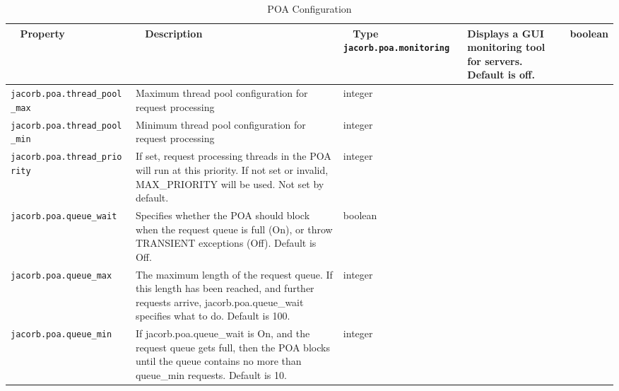 {{\begin{small}
\begin{longtable}{|p{5cm}|p{9cm}|p{2cm}|}
\hline
\end{longtable}
\end{small}


\begin{small}
\begin{longtable}{|p{5cm}|p{9cm}|p{2cm}|}
\caption{POA Configuration}\\
\hline
~ \hfill \textbf {Property} \hfill ~ & ~ \hfill \textbf {Description} \hfill ~ & ~ \hfill \textbf {Type} \hfill ~ \endhead
\hline
\verb"jacorb.poa.monitoring" & Displays a GUI monitoring tool for servers. Default is off. & boolean \\
\hline
\verb"jacorb.poa.thread_pool"
\verb"_max" & Maximum thread pool configuration for request processing & integer \\
\hline
\verb"jacorb.poa.thread_pool"
\verb"_min" & Minimum thread pool configuration for request processing & integer \\
\hline
\verb"jacorb.poa.thread_prio"
\verb"rity" & If set, request processing threads in the POA will run at this priority. If not set or invalid, MAX\_PRIORITY will be used. Not set by default. & integer \\
\hline
\verb"jacorb.poa.queue_wait" & Specifies whether the POA should block
when the request queue is full (On), or throw TRANSIENT exceptions
(Off). Default is Off. & boolean\\
\hline
\verb"jacorb.poa.queue_max" & The maximum length of the request
queue.  If this length has been reached, and further requests arrive,
jacorb.poa.queue\_wait specifies what to do. Default is 100. & integer \\
\hline
\verb"jacorb.poa.queue_min" & If jacorb.poa.queue\_wait is On, and the
request queue gets full, then the POA blocks until the queue contains
no more than queue\_min requests. Default is 10. & integer \\
\hline

\end{longtable}
\end{small}


}}

